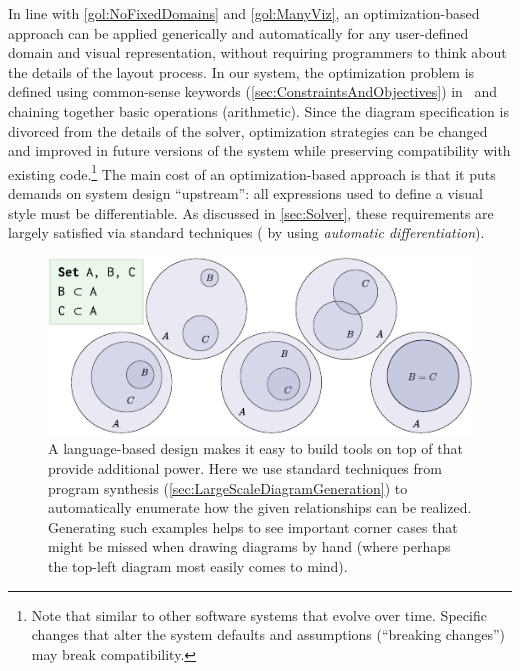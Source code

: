 In line with \ref{gol:NoFixedDomains} and \ref{gol:ManyViz}, an optimization-based approach can be applied generically and automatically for any user-defined domain and visual representation, without requiring programmers to think about the details of the layout process.  In our system, the optimization problem is defined using common-sense keywords (\cref{sec:ConstraintsAndObjectives}) in \Style\ and chaining together basic operations (\eg arithmetic).  Since the diagram specification is divorced from the details of the solver, optimization strategies can be changed and improved in future versions of the system while preserving compatibility with existing code.\footnote{Note that similar to other software systems that evolve over time. Specific changes that alter the system defaults and assumptions (``breaking changes'') may break compatibility.}  The main cost of an optimization-based approach is that it puts demands on system design ``upstream'': all expressions used to define a visual style must be differentiable. As discussed in \cref{sec:Solver}, these requirements are largely satisfied via standard techniques (\eg{} by using \textit{automatic differentiation}).

\begin{figure}[t]
   \begin{minipage}[c]{.5\linewidth}
   \includegraphics{assets/penrose/enumeration.pdf}
   \end{minipage}\hfill
   \begin{minipage}[c]{.4\linewidth}
   \caption{A language-based design makes it easy to build tools on top of \Penrose{} that provide additional power. Here we use standard techniques from program synthesis (\cref{sec:LargeScaleDiagramGeneration}) to automatically enumerate how the given relationships can be realized.  Generating such examples helps to see important corner cases that might be missed when drawing diagrams by hand (where perhaps the top-left diagram most easily comes to mind).\label{fig:enumerate-subsets}}
   \end{minipage}
\end{figure}

